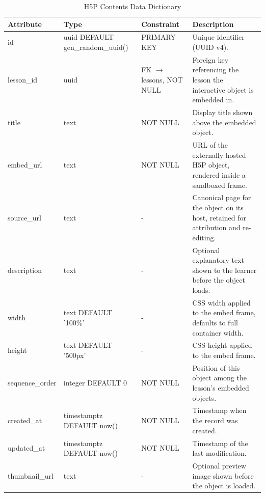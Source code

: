 \documentclass[12pt, oneside]{article} %
\newcommand{\tabbreak}{\hyphenpenalty=200\exhyphenpenalty=200\tolerance=4000\hbadness=10000\hspace{0pt}}
\begin{document}
\begin{table}[H]
\caption{H5P Contents Data Dictionary}
\label{tab:dd_h5p_contents}
\vspace{-4mm}
\begin{center}
\renewcommand{\arraystretch}{1.15}
\scriptsize
\begin{tabular}{|>{\raggedright\arraybackslash\tabbreak}p{2.67cm}|>{\raggedright\arraybackslash\tabbreak}p{2.93cm}|>{\raggedright\arraybackslash\tabbreak}p{2.67cm}|>{\raggedright\arraybackslash\tabbreak}p{4.51cm}|}
\hline
\textbf{Attribute} & \textbf{Type} & \textbf{Constraint} & \textbf{Description} \\ \hline
id & uuid DEFAULT gen\_random\_uuid() & PRIMARY KEY & Unique identifier (UUID v4). \\ \hline
lesson\_id & uuid & FK $\rightarrow$ lessons, NOT NULL & Foreign key referencing the lesson the interactive object is embedded in. \\ \hline
title & text & NOT NULL & Display title shown above the embedded object. \\ \hline
embed\_url & text & NOT NULL & URL of the externally hosted H5P object, rendered inside a sandboxed frame. \\ \hline
source\_url & text & - & Canonical page for the object on its host, retained for attribution and re-editing. \\ \hline
description & text & - & Optional explanatory text shown to the learner before the object loads. \\ \hline
width & text DEFAULT '100\%' & - & CSS width applied to the embed frame, defaults to full container width. \\ \hline
height & text DEFAULT '500px' & - & CSS height applied to the embed frame. \\ \hline
sequence\_order & integer DEFAULT 0 & NOT NULL & Position of this object among the lesson's embedded objects. \\ \hline
created\_at & timestamptz DEFAULT now() & NOT NULL & Timestamp when the record was created. \\ \hline
updated\_at & timestamptz DEFAULT now() & NOT NULL & Timestamp of the last modification. \\ \hline
thumbnail\_url & text & - & Optional preview image shown before the object is loaded. \\ \hline
\end{tabular}
\end{center}
\end{table}
\end{document}
